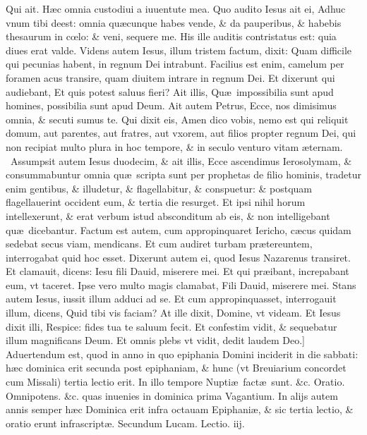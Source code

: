\documentclass[a5paper,10pt]{book}
\def\rightmarginnote{%
	\lrmarginnote{\hskip\columnwidth \hskip -1em}}
\def\ae{æ}
\def\oe{œ}
\begin{document}
\begin{multicols*}{2}
Qui ait. H\ae c omnia custodiui a iuuentute mea. Quo audito Iesus ait ei, Adhuc vnum tibi deest: omnia qu\ae cunque habes vende, \& da pauperibus, \&
habebis thesaurum in c\oe lo: \& veni, sequere me.
His ille auditis contristatus est: quia diues erat valde. Videns autem Iesus, illum tristem factum, dixit: Quam difficile qui pecunias habent, in regnum Dei intrabunt.
Facilius est enim, camelum per foramen acus transire, quam diuitem intrare in regnum Dei.
Et dixerunt qui audiebant, Et quis potest saluus fieri? Ait illis, Qu\ae \ impossibilia sunt apud homines, possibilia sunt apud Deum.
Ait autem Petrus, Ecce, nos dimisimus omnia, \& secuti sumus te. Qui dixit eis, Amen dico vobis, nemo est qui reliquit domum, aut parentes, aut fratres, aut vxorem, aut filios propter regnum Dei, qui non recipiat multo plura in hoc tempore, \& in seculo venturo vitam \ae ternam. \textdagger \
Assumpsit\rightmarginnote{E} autem Iesus duodecim, \& ait illis, Ecce ascendimus Ierosolymam, \& consummabuntur omnia qu\ae \ scripta sunt per prophetas de filio hominis, tradetur enim gentibus, \& illudetur, \& flagellabitur, \& conspuetur: \& postquam flagellauerint occident eum, \& tertia die resurget.
Et ipsi nihil horum intellexerunt, \& erat verbum istud absconditum ab eis, \& non intelligebant qu\ae \ dicebantur.
Factum est autem, cum appropinquaret Iericho, c\ae cus quidam sedebat secus viam, mendicans.
Et cum audiret turbam pr\ae tereuntem, interrogabat quid hoc esset. Dixerunt autem ei, quod Iesus Nazarenus transiret.
Et clamauit, dicens: Iesu fili Dauid, miserere mei. Et qui pr\ae ibant, increpabant eum, vt taceret. Ipse vero multo magis clamabat, Fili Dauid, miserere mei.
Stans autem Iesus, iussit illum adduci ad se. Et cum appropinquasset, interrogauit illum, dicens, Quid tibi vis faciam?
At ille dixit, Domine, vt videam. Et Iesus dixit illi, Respice: fides tua te saluum fecit. Et confestim vidit, \& sequebatur illum magnificans Deum. Et omnis plebs vt vidit, dedit laudem Deo.]
\newline \textswab{C} \color{red} Aduertendum est, quod in anno in quo epiphania Domini inciderit in die sabbati: h\ae c dominica erit secunda post epiphaniam, \& hunc (vt Breuiarium concordet cum Missali) tertia lectio erit. \color{black}In illo tempore Nupti\ae \ fact\ae \ sunt. \color{red} \&c. Oratio. \color{black} Omnipotens. \color{red} \&c. quas inuenies in dominica prima Vagantium. In alijs autem annis semper h\ae c Dominica erit infra octauam Epiphani\ae , \& sic tertia lectio, \& oratio erunt infrascript\ae . \color{black}
\newline \color{red} Secundum Lucam. \hfill Lectio. iij. \color{black}

\end{multicols*}
\end{document}
